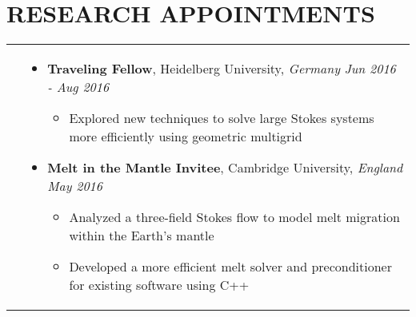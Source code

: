 \documentclass[10pt]{article}
\begin{document}
\section{\textbf{RESEARCH APPOINTMENTS}}
\vspace*{-\baselineskip}
\hskip-1.7in
\begin{tabularx}{1.5\linewidth}{>{\raggedleft\scshape}p{3cm}X}

  &\begin{itemize}
    \setlength\itemsep{.005em}
    
\item \textbf{Traveling Fellow}, Heidelberg University, \textit{Germany} \hspace{43 mm}\textit{Jun 2016 - Aug 2016}
  \vspace{-2mm}
   \begin{itemize}
   \setlength\itemsep{.005em}
   \item Explored new techniques to solve large Stokes systems more efficiently using geometric multigrid
   \end{itemize}  
 
            \item \textbf{Melt in the Mantle Invitee}, Cambridge University, \textit{England} \hspace{43 mm}\textit{May 2016}
              \vspace{-2mm}
             \begin{itemize}
             \setlength\itemsep{.005em}
   \item Analyzed a three-field Stokes flow to model melt migration within the Earth's mantle 
   \item Developed  a more efficient melt solver and preconditioner for existing software using C++ 
   \end{itemize}  
        
  \end{itemize} 
\end{tabularx}
 
 
\end{document}
